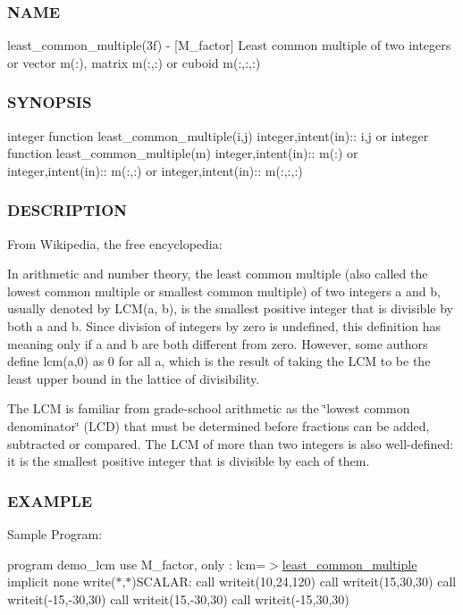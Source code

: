 \subsubsection*{N\+A\+ME}

least\+\_\+common\+\_\+multiple(3f) -\/ \mbox{[}M\+\_\+factor\mbox{]} Least common multiple of two integers or vector m(\+:), matrix m(\+:,\+:) or cuboid m(\+:,\+:,\+:) \subsubsection*{S\+Y\+N\+O\+P\+S\+IS}

integer function least\+\_\+common\+\_\+multiple(i,j) integer,intent(in)\+:\+: i,j or integer function least\+\_\+common\+\_\+multiple(m) integer,intent(in)\+:\+: m(\+:) or integer,intent(in)\+:\+: m(\+:,\+:) or integer,intent(in)\+:\+: m(\+:,\+:,\+:)

\subsubsection*{D\+E\+S\+C\+R\+I\+P\+T\+I\+ON}

From Wikipedia, the free encyclopedia\+:

In arithmetic and number theory, the least common multiple (also called the lowest common multiple or smallest common multiple) of two integers a and b, usually denoted by L\+C\+M(a, b), is the smallest positive integer that is divisible by both a and b. Since division of integers by zero is undefined, this definition has meaning only if a and b are both different from zero. However, some authors define lcm(a,0) as 0 for all a, which is the result of taking the L\+CM to be the least upper bound in the lattice of divisibility.

The L\+CM is familiar from grade-\/school arithmetic as the \char`\"{}lowest common
    denominator\char`\"{} (L\+CD) that must be determined before fractions can be added, subtracted or compared. The L\+CM of more than two integers is also well-\/defined\+: it is the smallest positive integer that is divisible by each of them.

\subsubsection*{E\+X\+A\+M\+P\+LE}

Sample Program\+:

program demo\+\_\+lcm use M\+\_\+factor, only \+: lcm=$>$\hyperlink{interfacem__factor_1_1least__common__multiple}{least\+\_\+common\+\_\+multiple} implicit none write($\ast$,$\ast$)\textquotesingle{}S\+C\+A\+L\+AR\+:\textquotesingle{} call writeit(10,24,120) call writeit(15,30,30) call writeit(-\/15,-\/30,30) call writeit(15,-\/30,30) call writeit(-\/15,30,30)

